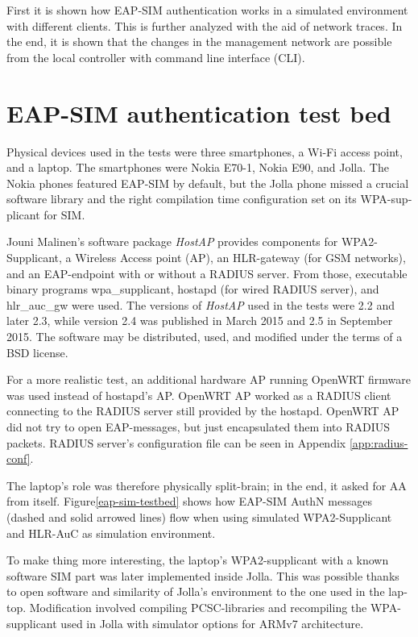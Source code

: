 \documentclass[12pt,a4paper,english]{tutthesis}
\begin{document}
\begin{otherlanguage}{english}
First it is shown how EAP-SIM authentication works in a simulated
environment with different clients.
This is further analyzed with the aid of network traces.
In the end, it is shown that the changes in the management network are possible from
the local controller with  command line interface (CLI).



\section{EAP-SIM authentication test bed}
\label{sec-5-1}



Physical devices used in the tests  were three smartphones, a Wi-Fi
access point, and a laptop.
The smartphones were Nokia E70-1, Nokia E90, and Jolla. The Nokia phones
featured EAP-SIM by default, but the Jolla phone missed a crucial
software library
and the right compilation time configuration set on its WPA-supplicant for SIM.

Jouni Malinen's software package \emph{HostAP} \cite{hostapd} provides
components for WPA2-Supplicant, a Wireless Access point (AP),
an HLR-gateway (for GSM networks), and an EAP-endpoint with or without
a RADIUS server. From those, executable binary programs  wpa\_supplicant, hostapd (for wired RADIUS
server), and hlr\_auc\_gw  were used.  
The versions of \emph{HostAP} used in the tests were 2.2 and later 2.3,
while version 2.4 was published in March 2015 and 2.5 in September 2015. The software
may be distributed, used, and modified under the terms of a BSD license.

For a more realistic test, an additional hardware AP running OpenWRT
firmware was used instead of hostapd's AP. OpenWRT AP worked as a
RADIUS client connecting to the RADIUS server still provided by the
hostapd.  OpenWRT AP did not try to open EAP-messages, but just
encapsulated them into RADIUS packets.  RADIUS server's configuration
file can be seen in Appendix \ref{app:radius-conf}.


The laptop's role was therefore physically split-brain; in the end, it asked for AA
from itself.
Figure\ref{eap-sim-testbed} shows how EAP-SIM AuthN messages (dashed
and solid arrowed lines) flow when using 
simulated WPA2-Supplicant and HLR-AuC as simulation environment.

To make thing more interesting, the laptop's WPA2-supplicant with a known
software SIM part was later implemented inside Jolla. This was
possible thanks to open software and similarity of Jolla's environment to
the one used in the laptop. Modification involved compiling PCSC-libraries and
recompiling the WPA-supplicant used in Jolla with simulator options 
for ARMv7 architecture.




\end{otherlanguage}
\end{document}
